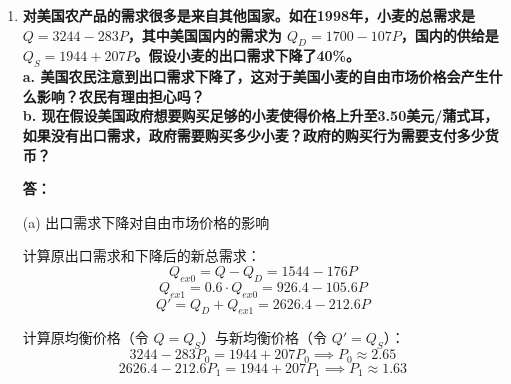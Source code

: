 \begin{enumerate}[label=\textbf{\arabic*.}, leftmargin=*]
			\textbf{a. 求出需求方程和供给方程。\\
				b. 在价格等于9美元处，需求的价格弹性是多少？在价格等于12美元处呢？\\
				c. 在价格等于9美元处，供给的价格弹性是多少？在价格等于12美元处呢？\\
				d. 在自由市场上，植物纤维在美国的价格是多少？此时的进口数量是多少？}
			
			\textbf{答：}
			
			(a) 联立表格数据得：
				$$Q_d = 40 - 2P,\quad Q_s = \frac{2}{3}P$$
			(b) 需求价格弹性：
				$$E_d = \frac{dQ_d}{dP} \cdot \frac{P}{Q_d}$$
				
				$P=9$ 时：$Q_d=22 \implies E_d = -0.82$\\
				$P=12$ 时：$Q_d=16 \implies E_d = -1.5$\\
			(c) 供给价格弹性：
				$$E_s = \frac{dQ_s}{dP} \cdot \frac{P}{Q_s}$$

				$P=9$ 时：$Q_s=6 \implies E_s = 1$\\
				$P=12$ 时：$Q_s=8 \implies E_s = 1$

			(d) 自由市场价格与进口量
			
			1. 封闭国内均衡：令 $Q_d = Q_s$，解得国内自给自足均衡价 $P=15$ 美元。
			
			2. 开放自由市场：世界价格 $9$ 美元更低，美国国内价格等于世界价格 $P=9$ 美元。
			
			3. 进口量计算：
				$$\text{进口} = Q_d - Q_s = 22 - 6 = 16 \text{（百万磅）}$$
				
			\item \textbf{对美国农产品的需求很多是来自其他国家。如在1998年，小麦的总需求是 $Q=3244-283P$，其中美国国内的需求为 $Q_D=1700-107P$，国内的供给是 $Q_S=1944+207P$。假设小麦的出口需求下降了40\%。\\
				a. 美国农民注意到出口需求下降了，这对于美国小麦的自由市场价格会产生什么影响？农民有理由担心吗？\\
				b. 现在假设美国政府想要购买足够的小麦使得价格上升至3.50美元/蒲式耳，如果没有出口需求，政府需要购买多少小麦？政府的购买行为需要支付多少货币？}
			
			\textbf{答：}
			
			(a) 出口需求下降对自由市场价格的影响
			
			计算原出口需求和下降后的新总需求：
				$$Q_{ex0} = Q - Q_D = 1544 - 176P$$
				$$Q_{ex1} = 0.6 \cdot Q_{ex0} = 926.4 - 105.6P$$
				$$Q' = Q_D + Q_{ex1} = 2626.4 - 212.6P$$
			
			计算原均衡价格（令 $Q = Q_S$）与新均衡价格（令 $Q' = Q_S$）：
				$$3244 - 283P_0 = 1944 + 207P_0 \implies P_0 \approx 2.65$$
				$$2626.4 - 212.6P_1 = 1944 + 207P_1 \implies P_1 \approx 1.63$$
			

\end{enumerate}
